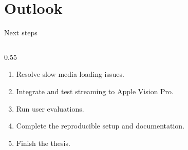 \section{Outlook}
\begin{frame}[c]{Next steps}
\begin{columns}[T,onlytextwidth]
  \begin{column}{0.55\textwidth}
    \small
    \begin{enumerate}
      \item Resolve slow media loading issues.
      \item Integrate and test streaming to Apple Vision Pro.
      \item Run user evaluations.
      \item Complete the reproducible setup and documentation.
      \item Finish the thesis.
    \end{enumerate}
  \end{column}
\end{columns}

\end{frame}
